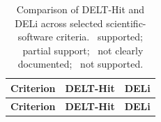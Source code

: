 \newcommand{\statusgreen}{\raisebox{0.15ex}{\textcolor{green!50!black}{\LARGE$\bullet$}}}
\newcommand{\statusamber}{\raisebox{0.15ex}{\textcolor{orange!90!black}{\LARGE$\bullet$}}}
\newcommand{\statusopen}{\raisebox{0.15ex}{\textcolor{black!30}{\LARGE$\bullet$}}}
\newcommand{\statusred}{\raisebox{0.15ex}{\textcolor{blue!70!black}{\LARGE$\bullet$}}}
\begin{longtable}{p{8.8cm}>{\centering\arraybackslash}p{2.8cm}>{\centering\arraybackslash}p{1.2cm}}
\caption{Comparison of DELT-Hit and DELi\cite{wellnitz_opensourcednaencodedlibrary_2025} across selected scientific-software criteria. \statusgreen\ supported; \statusamber\ partial support; \statusopen\ not clearly documented; \statusred\ not supported.}
\label{tab:delt-deli-comparison} \\
\toprule
\textbf{Criterion} & \textbf{DELT-Hit} & \textbf{DELi} \\
\midrule
\endfirsthead

\toprule
\textbf{Criterion} & \textbf{DELT-Hit} & \textbf{DELi} \\
\midrule
\endhead


\end{longtable}
